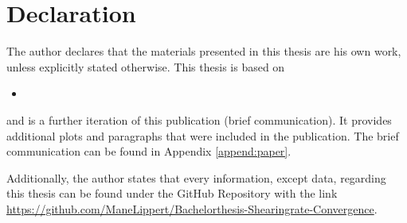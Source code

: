 \NewPage
\chapter*{Declaration}
\label{chap:declaration}

The author declares that the materials presented in this thesis are his own work, unless explicitly stated otherwise. This thesis is based on
\bigskip
\begin{itemize}
    \item [] 
\end{itemize}
\bigskip
and is a further iteration of this publication (brief communication). It provides additional plots and paragraphs that were included in the publication. The brief communication can be found in Appendix \ref{append:paper}.\bigskip

Additionally, the author states that every information, except data, regarding this thesis can be found under the GitHub Repository with the link \url{https://github.com/ManeLippert/Bachelorthesis-Shearingrate-Convergence}.